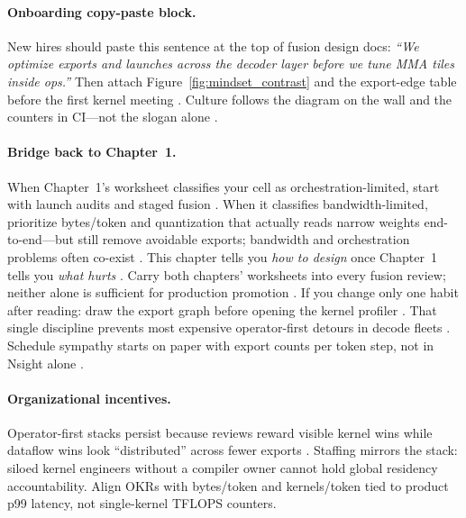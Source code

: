 \paragraph{Onboarding copy-paste block.}
New hires should paste this sentence at the top of fusion design docs: \emph{``We optimize exports and launches across the decoder layer before we tune MMA tiles inside ops.''} \citep{taxbreak2026,patel2025llminference}
Then attach Figure~\ref{fig:mindset_contrast} and the export-edge table before the first kernel meeting \citep{memoryfloor2026}.
Culture follows the diagram on the wall and the counters in CI---not the slogan alone \citep{yirage2026}.

\paragraph{Bridge back to Chapter~1.}
When Chapter~1's worksheet classifies your cell as orchestration-limited, start with launch audits and staged fusion \citep{taxbreak2026,nvidia2024cudagraphs}.
When it classifies bandwidth-limited, prioritize bytes/token and quantization that actually reads narrow weights end-to-end---but still remove avoidable exports; bandwidth and orchestration problems often co-exist \citep{memoryfloor2026,liu2024deepseekv3}.
This chapter tells you \emph{how to design} once Chapter~1 tells you \emph{what hurts} \citep{patel2025llminference}.
Carry both chapters' worksheets into every fusion review; neither alone is sufficient for production promotion \citep{taxbreak2026,memoryfloor2026,yirage2026}.
If you change only one habit after reading: draw the export graph before opening the kernel profiler \citep{patel2025llminference}.
That single discipline prevents most expensive operator-first detours in decode fleets \citep{taxbreak2026,memoryfloor2026}.
Schedule sympathy starts on paper with export counts per token step, not in Nsight alone \citep{patel2025llminference,nvidia2022hopper,taxbreak2026}.

\paragraph{Organizational incentives.}
Operator-first stacks persist because reviews reward visible kernel wins while dataflow wins look ``distributed'' across fewer exports \citep{patel2025llminference}.
Staffing mirrors the stack: siloed kernel engineers without a compiler owner cannot hold global residency accountability.
Align OKRs with bytes/token and kernels/token tied to product p99 latency, not single-kernel TFLOPS counters.

